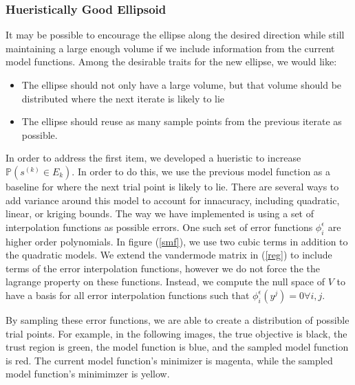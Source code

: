 \documentclass{article}
\let\oldref\ref
\renewcommand{\ref}[1]{(\oldref{#1})}
\begin{document}




\subsubsection{Hueristically Good Ellipsoid}

It may be possible to encourage the ellipse along the desired direction while still maintaining a large enough volume if we include information from the current model functions.
Among the desirable traits for the new ellipse, we would like:
\begin{itemize}
    \item The ellipse should not only have a large volume, but that volume should be distributed where the next iterate is likely to lie
    \item The ellipse should reuse as many sample points from the previous iterate as possible.
\end{itemize}



In order to address the first item, we developed a hueristic to increase $\mathbb P(s^{(k)} \in E_k)$.
In order to do this, we use the previous model function as a baseline for where the next trial point is likely to lie.
There are several ways to add variance around this model to account for innacuracy, including quadratic, linear, or kriging bounds.
The way we have implemented is using a set of interpolation functions as possible errors.
One such set of error functions $\phi^{\epsilon}_i$ are higher order polynomials.
In figure \ref{smf}, we use two cubic terms in addition to the quadratic models.
We extend the vandermode matrix in \ref{reg} to include terms of the error interpolation functions, however we do not force the the lagrange property on these functions.
Instead, we compute the null space of $V$ to have a basis for all error interpolation functions such that $\phi^{\epsilon}_i(y^j) = 0 \forall i,j$.

By sampling these error functions, we are able to create a distribution of possible trial points.
For example, in the following images, the true objective is black, the trust region is green, the model function is blue, and the sampled model function is red.
The current model function's minimizer is magenta, while the sampled model function's minimimzer is yellow.
\end{document}
